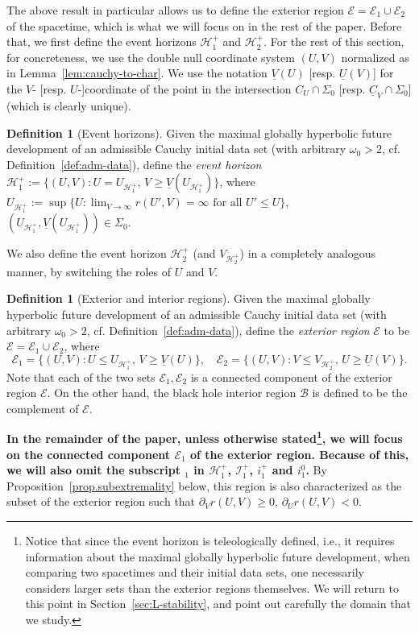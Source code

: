 \documentclass[10pt, reqno]{amsart}
\theoremstyle{definition}
\newtheorem{definition}[theorem]{Definition}
\theoremstyle{remark}
\theoremstyle{conjecture}
\numberwithin{equation}{section}
\newcommand{\set}[1]{\{#1\}}
\newcommand{\rd}{\partial}
\newcommand{\0}{\emptyset}
\newcommand{\Sgm}{\Sigma}
\newcommand{\omg}{\omega}
\newcommand{\calH}{\mathcal H}
\newcommand{\calI}{\mathcal I}
\newcommand{\uC}{\underline{C}}
\newcommand{\EH}{\calH^{+}}
\newcommand{\NI}{\calI^{+}}						%
\newcommand{\Int}{\mathscr{B}}
\newcommand{\Ext}{\mathscr{E}}
\begin{document}
The above result in particular allows us to define the exterior region $\Ext = \Ext_{1} \cup \Ext_{2}$ of the spacetime, which is what we will focus on in the rest of the paper. Before that, we first define the event horizons $\EH_1$ and $\EH_2$. For the rest of this section, for concreteness, we use the double null coordinate system $(U, V)$ normalized as in Lemma~\ref{lem:cauchy-to-char}. We use the notation $\underline{V}(U)$ [resp. $\underline{U}(V)$] for the $V$- [resp. $U$-]coordinate of the point in the intersection $C_{U} \cap \Sgm_{0}$ [resp. $\uC_{V} \cap \Sgm_{0}$] (which is clearly unique).
\begin{definition}[Event horizons]\label{def.EH}
Given the maximal globally hyperbolic future development of an admissible Cauchy initial data set (with arbitrary $\omg_{0} > 2$, cf. Definition~\ref{def:adm-data}), define the \emph{event horizon} $\EH_1:=\{(U,V): U=U_{\EH_1},\, V \geq \underline{V}(U_{\EH_1}) \}$, where $U_{\EH_1}:=\sup \{U: \lim_{V \to \infty} r(U', V)=\infty \mbox{ for all }U'\leq U\}$, $(U_{\EH_1},\underline{V}(U_{\EH_1}))\in \Sigma_0$.

We also define the event horizon $\EH_2$ (and $V_{\EH_2}$) in a completely analogous manner, by switching the roles of $U$ and $V$.
\end{definition}

\begin{definition}[Exterior and interior regions]
Given the maximal globally hyperbolic future development of an admissible Cauchy initial data set (with arbitrary $\omg_{0}>2$, cf. Definition~\ref{def:adm-data}), define the \emph{exterior region} $\Ext$ to be $\Ext = \Ext_{1} \cup \Ext_{2}$, where
\begin{equation*}
\Ext_{1} = \set{(U, V) : U \leq U_{\EH_{1}}, \, V \geq \underline{V}(U)}, \quad
\Ext_{2} = \set{(U, V) : V \leq V_{\EH_{2}}, \, U \geq \underline{U}(V)}.
\end{equation*}
Note that each of the two sets $\Ext_{1}, \Ext_{2}$ is a connected component of the exterior region $\Ext$.
On the other hand, the black hole interior region $\Int$ is defined to be the complement of $\Ext$.
\end{definition}



\textbf{In the remainder of the paper, unless otherwise stated\footnote{Notice that since the event horizon is teleologically defined, i.e., it requires information about the maximal globally hyperbolic future development, when comparing two spacetimes and their initial data sets, one necessarily considers larger sets than the exterior regions themselves. We will return to this point in Section~\ref{sec:L-stability}, and point out carefully the domain that we study.}, we will focus on the connected component $\Ext_{1}$ of the exterior region. Because of this, we will also omit the subscript ${ }_1$ in $\EH_1$, $\NI_1$, $i^+_1$ and $i^0_1$.} By Proposition~\ref{prop.subextremality} below, this region is also characterized as the subset of the exterior region such that $\rd_V r (U,V)\geq 0$, $\rd_U r (U,V) < 0.$
\end{document}
